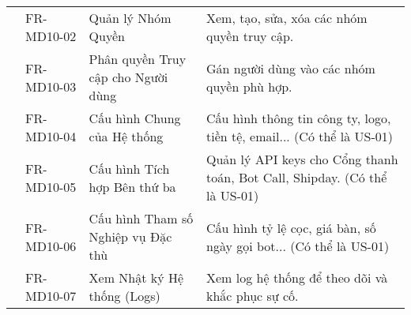 \begin{longtable}{|m{2.5cm}|m{2.5cm}|m{5cm}|m{5cm}|}
	                                                        & FR-MD10-02            & Quản lý Nhóm Quyền                                     & Xem, tạo, sửa, xóa các nhóm quyền truy cập.                                                 \\
	                                                        & FR-MD10-03            & Phân quyền Truy cập cho Người dùng                     & Gán người dùng vào các nhóm quyền phù hợp.                                                  \\
	                                                        & FR-MD10-04            & Cấu hình Chung của Hệ thống                            & Cấu hình thông tin công ty, logo, tiền tệ, email... (Có thể là US-01)                       \\
	                                                        & FR-MD10-05            & Cấu hình Tích hợp Bên thứ ba                           & Quản lý API keys cho Cổng thanh toán, Bot Call, Shipday. (Có thể là US-01)                  \\
	                                                        & FR-MD10-06            & Cấu hình Tham số Nghiệp vụ Đặc thù                     & Cấu hình tỷ lệ cọc, giá bàn, số ngày gọi bot... (Có thể là US-01)                           \\
	                                                        & FR-MD10-07            & Xem Nhật ký Hệ thống (Logs)                            & Xem log hệ thống để theo dõi và khắc phục sự cố.                                            \\
	\hline
\end{longtable}

\newpage


